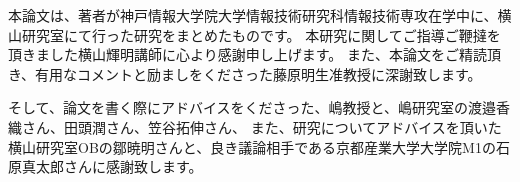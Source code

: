 本論文は、著者が神戸情報大学院大学情報技術研究科情報技術専攻在学中に、横山研究室にて行った研究をまとめたものです。
本研究に関してご指導ご鞭撻を頂きました横山輝明講師に心より感謝申し上げます。
また、本論文をご精読頂き、有用なコメントと励ましをくださった藤原明生准教授に深謝致します。
\medskip

そして、論文を書く際にアドバイスをくださった、嶋教授と、嶋研究室の渡邉香織さん、田頭潤さん、笠谷拓伸さん、
また、研究についてアドバイスを頂いた横山研究室OBの鄒暁明さんと、良き議論相手である京都産業大学大学院M1の石原真太郎さんに感謝致します。




